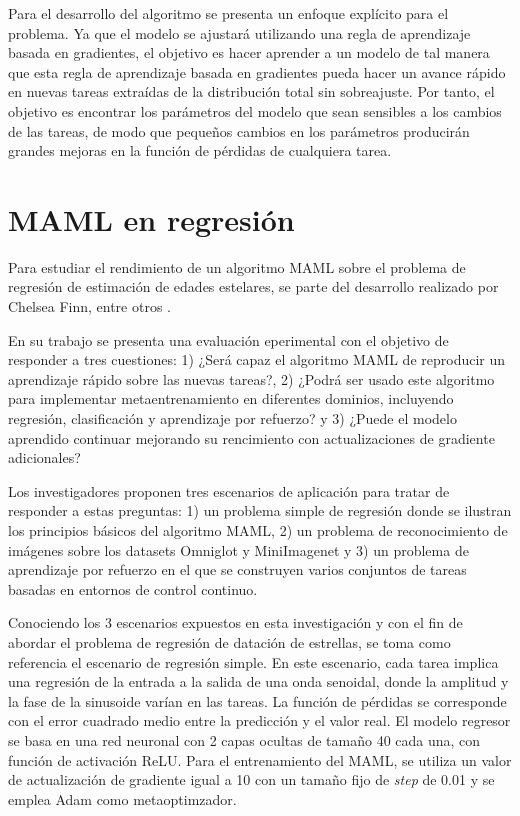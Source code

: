Para el desarrollo del algoritmo se presenta un enfoque explícito para el problema. Ya que el modelo se ajustará utilizando una regla de aprendizaje basada en gradientes, el objetivo es hacer aprender a un modelo de tal manera que esta regla de aprendizaje basada en gradientes pueda hacer un avance rápido en nuevas tareas extraídas de la distribución total sin sobreajuste. Por tanto, el objetivo es encontrar los parámetros del modelo que sean sensibles a los cambios de las tareas, de modo que pequeños cambios en los parámetros producirán grandes mejoras en la función de pérdidas de cualquiera tarea. 

\section{MAML en regresión}

Para estudiar el rendimiento de un algoritmo MAML sobre el problema de regresión de estimación de edades estelares, se parte del desarrollo realizado por Chelsea Finn, entre otros \cite{finn2017modelagnostic}. 

En su trabajo se presenta una evaluación eperimental con el objetivo de responder a tres cuestiones: 1) ¿Será capaz el algoritmo MAML de reproducir un aprendizaje rápido sobre las nuevas tareas?, 2) ¿Podrá ser usado este algoritmo para implementar metaentrenamiento en diferentes dominios, incluyendo regresión, clasificación y aprendizaje por refuerzo? y 3) ¿Puede el modelo aprendido continuar mejorando su rencimiento con actualizaciones de gradiente adicionales?

Los investigadores proponen tres escenarios de aplicación para tratar de responder a estas preguntas: 1) un problema simple de regresión donde se ilustran los principios básicos del algoritmo MAML, 2) un problema de reconocimiento de imágenes sobre los datasets Omniglot y MiniImagenet y 3) un problema de aprendizaje por refuerzo en el que se construyen varios conjuntos de tareas basadas en entornos de control continuo.

Conociendo los 3 escenarios expuestos en esta investigación y con el fin de abordar el problema de regresión de datación de estrellas, se toma como referencia el escenario de regresión simple. En este escenario, cada tarea implica una regresión de la entrada a la salida de una onda senoidal, donde la amplitud y la fase de la sinusoide varían en las tareas. La función de pérdidas se corresponde con el error cuadrado medio entre la predicción y el valor real. El modelo regresor se basa en una red neuronal con 2 capas ocultas de tamaño 40 cada una, con función de activación ReLU. Para el entrenamiento del MAML, se utiliza un valor de actualización de gradiente igual a 10 con un tamaño fijo de \emph{step} de 0.01 y se emplea Adam como metaoptimzador.

